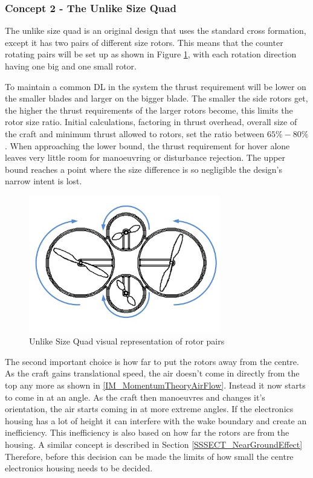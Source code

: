 \subsubsection{Concept 2 - The Unlike Size Quad}
The unlike size quad is an original design that uses the standard cross formation, except it has two pairs of different size rotors. This means that the counter rotating pairs will be set up as shown in Figure \ref{IM_UnlikeSizePair}, with each rotation direction having one big and one small rotor. 

To maintain a common DL in the system the thrust requirement will be lower on the smaller blades and larger on the bigger blade. The smaller the side rotors get, the higher the thrust requirements of the larger rotors become, this limits the rotor size ratio. Initial calculations, factoring in thrust overhead, overall size of the craft and minimum thrust allowed to rotors, set the ratio between $65\% - 80\%$.  When approaching the lower bound, the thrust requirement for hover alone leaves very little room for manoeuvring or disturbance rejection. The upper bound reaches a point where the size difference is so negligible the design's narrow intent is lost.

\begin{figure}[H]
\centering
\includegraphics[height = 6cm]{Images/Design/UnlikeSizeRotorPair}
\caption{Unlike Size Quad visual representation of rotor pairs}
\label{IM_UnlikeSizePair}
\end{figure}

The second important choice is how far to put the rotors away from the centre. As the craft gains translational speed, the air doesn't come in directly from the top any more as shown in \ref{IM_MomentumTheoryAirFlow}. Instead it now starts to come in at an angle. As the craft then manoeuvres and changes it's orientation, the air starts coming in at more extreme angles. If the electronics housing has a lot of height it can interfere with the wake boundary and create an inefficiency. This inefficiency is also based on how far the rotors are from the housing. A similar concept is described in Section \ref{SSSECT_NearGroundEffect} Therefore, before this decision can be made the limits of how small the centre electronics housing needs to be decided. 

